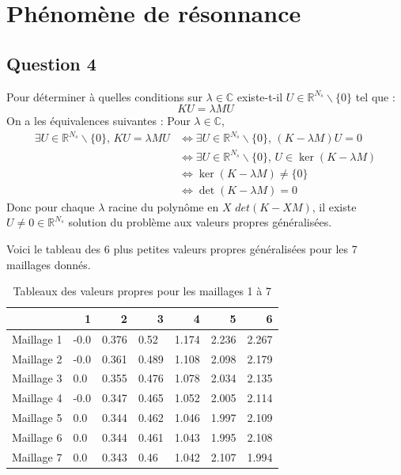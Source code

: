 \documentclass[a4paper,12pt]{article}
\begin{document}
\section{Ph\'enom\`ene de r\'esonnance}



\subsection{Question 4}

Pour déterminer à quelles conditions sur $\lambda \in \mathbb{C}$ existe-t-il $U \in \mathbb{R}^{N_{s}} \backslash \{0\}$ tel que :
\[
KU = \lambda MU
\]
On a les équivalences suivantes : Pour $\lambda \in \mathbb{C}$,
\begin{align*}
\exists U \in \mathbb{R}^{N_{s}} \backslash \{0\} \text{, } KU = \lambda MU & \iff \exists U \in \mathbb{R}^{N_{s}} \backslash \{0\} \text{, } \left( K-\lambda M \right) U = 0\\
& \iff  \exists U \in \mathbb{R}^{N_{s}} \backslash \{0\} \text{, } U \in \ker(K-\lambda M)\\
& \iff \ker(K-\lambda M) \ne \{0\}\\
& \iff \det(K - \lambda M) = 0
\end{align*}
Donc pour chaque $\lambda$ racine du polynôme en $X$ $det(K - X M)$, il existe $U \ne 0 \in \mathbb{R}^{N_{s}}$ solution du problème aux valeurs propres généralisées.

\newpage

Voici le tableau des 6 plus petites valeurs propres généralisées pour les 7 maillages donnés.

\begin{table}[htbp]
\centering
\caption{Tableaux des valeurs propres pour les maillages 1 à 7}
\begin{tabular}{|l|l|l|l|l|l|l|}
\hline
 & \multicolumn{1}{r|}{1} & \multicolumn{1}{r|}{2} & \multicolumn{1}{r|}{3} & \multicolumn{1}{r|}{4} & \multicolumn{1}{r|}{5} & \multicolumn{1}{r|}{6} \\ \hline
Maillage 1 & -0.0 & 0.376 & 0.52 & 1.174 & 2.236 & 2.267 \\ \hline
Maillage 2 & -0.0 & 0.361 & 0.489 & 1.108 & 2.098 & 2.179 \\ \hline
Maillage 3 & 0.0 & 0.355 & 0.476 & 1.078 & 2.034 & 2.135 \\ \hline
Maillage 4 & -0.0 & 0.347 & 0.465 & 1.052 & 2.005 & 2.114 \\ \hline
Maillage 5 & 0.0 & 0.344 & 0.462 & 1.046 & 1.997 & 2.109 \\ \hline
Maillage 6 & 0.0 & 0.344 & 0.461 & 1.043 & 1.995 & 2.108 \\ \hline
Maillage 7 & 0.0 & 0.343 & 0.46 & 1.042 & 2.107 & 1.994 \\ \hline
\end{tabular}
\label{}
\end{table}
\end{document}
